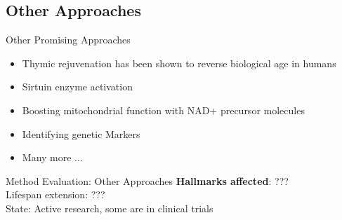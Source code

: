 \subsection{Other Approaches}

\begin{frame}[c]{Other Promising Approaches}
    \large
    \begin{itemize}[<+(1)->]
        \item Thymic rejuvenation has been shown to reverse biological age in humans \cite{fahy2019reversal}
        \item Sirtuin enzyme activation \cite{mohar2012sirtuin}
        \item Boosting mitochondrial function with NAD+ precursor molecules \cite{aman2018therapeutic}
        \item Identifying genetic Markers \cite{kenyon2010genetics}
        \item Many more ...
    \end{itemize}
\end{frame}


\begin{frame}[c]{Method Evaluation: Other Approaches}
    \large
    \textbf{Hallmarks affected}: ??? \\
    \pause
    Lifespan extension: ??? \\
    \pause
    State: Active research, some are in clinical trials
\end{frame}
